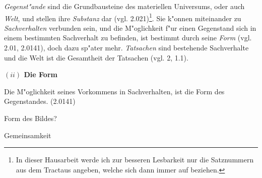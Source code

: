 \documentclass[a4paper, emulatestandardclasses, 12pt]{scrartcl}
\begin{document}
\begin{onehalfspace}
\emph{Gegenst"ande} sind die Grundbausteine des materiellen Universums, oder auch \emph{Welt}, und stellen ihre \emph{Substanz} dar (vgl. 2.021)\footnote{In dieser Hausarbeit werde ich zur besseren Lesbarkeit nur die Satznummern aus dem Tractaus angeben, welche sich dann immer auf \cite{wittgenstein1963tractatus} beziehen.}. Sie k"onnen miteinander zu \emph{Sachverhalten} verbunden sein, und die M"oglichkeit f"ur einen Gegenstand sich in einem bestimmten Sachverhalt zu befinden, ist bestimmt durch seine \emph{Form} (vgl. 2.01, 2.0141), doch dazu sp"ater mehr. \emph{Tatsachen} sind bestehende Sachverhalte und die Welt ist die Gesamtheit der Tatsachen (vgl. 2, 1.1).



\vspace{5mm}
\noindent\textbf{$(ii)$ Die Form}	

\noindent Die M"oglichkeit seines Vorkommens in Sachverhalten, ist die Form des Gegenstandes. (2.0141)

Form des Bildes?

Gemeinsamkeit

\end{onehalfspace}


\end{document}
